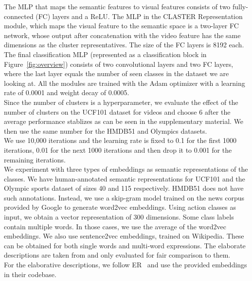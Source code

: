 \documentclass[runningheads]{llncs}
\begin{document}
 The MLP that maps the semantic features to visual features consists of two fully-connected (FC) layers and a ReLU. The MLP in the CLASTER Representation module, which maps the visual feature to the semantic space is a two-layer FC network, whose output after concatenation with the video feature has the same dimensions as the cluster representatives. The size of the FC layers is 8192 each. The final classification MLP (represented as a classification block in Figure~\ref{fig:overview}) consists of two convolutional layers and two FC layers, where the last layer equals the number of seen classes in the dataset we are looking at. All the modules are trained with the Adam optimizer with a learning rate of 0.0001 and weight
decay of 0.0005.\\ 

 Since the number of clusters is a hyperparameter, we evaluate the effect of the number of clusters on the UCF101 dataset for videos and choose 6 after the average performance stablizes as can be seen in the supplementary material. We then use the same number for the HMDB51 and Olympics datasets. \\ 

 We use 10,000 iterations and the learning rate  is fixed to 0.1 for the first 1000 iterations, 0.01 for the next 1000 iterations and then drop it to 0.001 for the remaining iterations.
\\ 




 We experiment with three types of embeddings as semantic representations of the classes. We have human-annotated semantic representations for UCF101 and the Olympic sports dataset of sizes 40 and 115 respectively. HMDB51 does not have such annotations. 
Instead, we use a skip-gram model trained on the news corpus provided by Google to generate word2vec embeddings. Using action classes as input, we obtain a vector representation of 300 dimensions.
Some class labels contain multiple words. In those cases, we use the average of the word2vec embeddings. We also use sentence2vec embeddings, trained on Wikipedia. These can be obtained for both single words and multi-word expressions. The elaborate descriptions are taken from \cite{er} and only evaluated for fair comparison to them.\\
For the elaborative descriptions, we follow ER~\cite{er} and use the provided embeddings in their codebase.
\\
\end{document}
